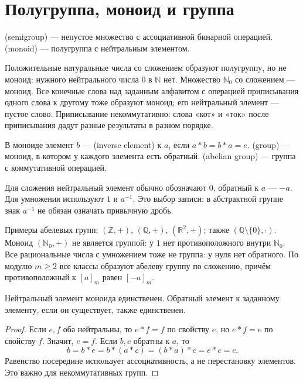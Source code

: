 \section{Полугруппа, моноид и группа}
\begin{definition}
 (semigroup) — непустое множество с ассоциативной бинарной операцией.  (monoid) — полугруппа с нейтральным элементом.
\end{definition}
Положительные натуральные числа со сложением образуют полугруппу, но не моноид: нужного нейтрального числа \(0\) в \(\mathbb N\) нет. Множество \(\mathbb N_0\) со сложением — моноид. Все конечные слова над заданным алфавитом с операцией приписывания одного слова к другому тоже образуют моноид; его нейтральный элемент — пустое слово. Приписывание некоммутативно: слова «кот» и «ток» после приписывания дадут разные результаты в разном порядке.

\begin{definition}
В моноиде элемент \(b\) —  (inverse element) к \(a\), если \(a*b=b*a=e\).  (group) — моноид, в котором у каждого элемента есть обратный.  (abelian group) — группа с коммутативной операцией.
\end{definition}
Для сложения нейтральный элемент обычно обозначают \(0\), обратный к \(a\) — \(-a\). Для умножения используют \(1\) и \(a^{-1}\). Это выбор записи: в абстрактной группе знак \(a^{-1}\) не обязан означать привычную дробь.

Примеры абелевых групп: \((\mathbb Z,+)\), \((\mathbb Q,+)\), \((\mathbb R^2,+)\); также \((\mathbb Q\setminus\{0\},\cdot)\). Моноид \((\mathbb N_0,+)\) не является группой: у \(1\) нет противоположного внутри \(\mathbb N_0\). Все рациональные числа с умножением тоже не группа: у нуля нет обратного. По модулю \(m\ge2\) все классы образуют абелеву группу по сложению, причём противоположный к \([a]_m\) равен \([-a]_m\).

\begin{theorem}\label{thm:legacy-c22-1}
Нейтральный элемент моноида единственен. Обратный элемент к заданному элементу, если он существует, также единственен.
\end{theorem}
\begin{proof}
Если \(e,f\) оба нейтральны, то \(e*f=f\) по свойству \(e\), но \(e*f=e\) по свойству \(f\). Значит, \(e=f\). Если \(b,c\) обратны к \(a\), то
\[
b=b*e=b*(a*c)=(b*a)*c=e*c=c.
\]
Равенство посередине использует ассоциативность, а не перестановку элементов. Это важно для некоммутативных групп.
\end{proof}

